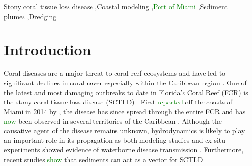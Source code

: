 \documentclass[preprint,12pt,authoryear]{elsarticle}
\newcommand{\modif}[1]{\textcolor{green}{#1}}
\begin{document}
\begin{frontmatter}
    \begin{keyword}
        Stony coral tissue loss disease \sep Coastal modeling \sep \modif{Port of Miami} \sep Sediment plumes \sep Dredging



    \end{keyword}

\end{frontmatter}

\linenumbers

\section{Introduction}

Coral diseases are a major threat to coral reef ecosystems and have led to significant declines in coral cover especially within the Caribbean region \citep{richardson1998coral, sutherland2004disease, aronson2001white, harvell2007coral, brandt2009dynamics}. One of the latest and most damaging outbreaks to date in Florida's Coral Reef (FCR) is the stony coral tissue loss disease (SCTLD) \citep{noaa2018}. First \modif{reported} off the coasts of Miami in 2014 by \cite{precht2016unprecedented}, the disease has since spread through the entire FCR \citep{muller2020spatial,dobbelaere2022connecting} and has \modif{now} been observed in several territories of the Caribbean \citep{kramer2019map, meiling2021variable, estrada2021effects,heres2021ecological}. Although the causative agent of the disease remains unknown, hydrodynamics is likely to play an important role in its propagation as both modeling studies and ex situ experiments showed evidence of waterborne disease transmission \citep{aeby2019pathogenesis,dobbelaere2020coupled,eaton2021measuring, meiling2021variable}. Furthermore, recent studies \modif{show} that sediments can act as  a vector for SCTLD \citep{rosales2020rhodobacterales, studivan2022reef}.
\end{document}
